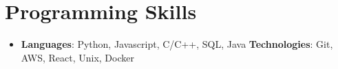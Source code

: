 \documentclass[letterpaper,11pt]{article}
\newcommand{\resumeSubHeadingListStart}{\begin{itemize}[leftmargin=*]}
\newcommand{\resumeSubHeadingListEnd}{\end{itemize}}
\begin{document}
%
\section{Programming Skills}
  \resumeSubHeadingListStart
    \item{
      \textbf{Languages}{: Python, Javascript, C/C++, SQL, Java}
      \hfill
      \textbf{Technologies}{: Git, AWS, React, Unix, Docker}
    }
  \resumeSubHeadingListEnd


\end{document}

